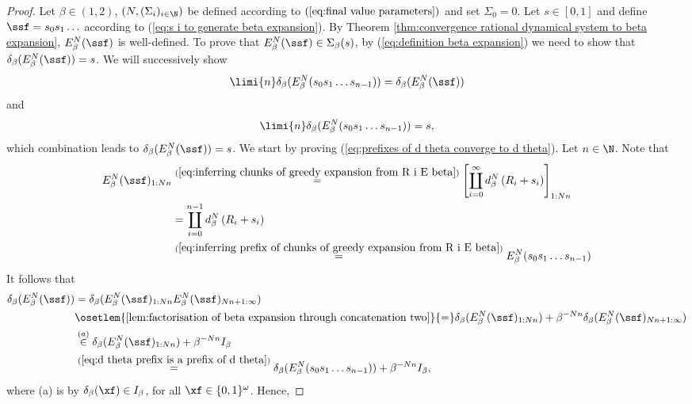 \begin{proof}
	Let $\beta \in (1,2)$, $(N,(\Sigma_i)_{i \in \N})$ be defined according to $(\ref{eq:final value parameters})$ and set $\Sigma_0 = 0$. Let $s \in [0,1]$ and define $\ssf = s_0s_1\ldots$ according to (\ref{eq:s i to generate beta expansion}). By Theorem \ref{thm:convergence rational dynamical system to beta expansion}, $E_\beta^N(\ssf)$ is well-defined. To prove that $E_\beta^N(\ssf) \in \Sigma_\beta(s)$, by (\ref{eq:definition beta expansion}) we need to show that $\delta_\beta(E_\beta^N(\ssf)) = s$. We will successively show 
	\begin{equation}\label{eq:prefixes of d theta converge to d theta}
		\limi{n} \delta_\beta(E_\beta^N(s_0s_1\ldots s_{n-1})) = \delta_\beta(E_\beta^N(\ssf))
	\end{equation}
	and
	\begin{equation}\label{eq:prefixes of d theta converge to s}
		\limi{n} \delta_\beta(E_\beta^N(s_0s_1\ldots s_{n-1})) = s,
	\end{equation}
	which combination leads to $\delta_\beta(E_\beta^N(\ssf)) = s$. We start by proving (\ref{eq:prefixes of d theta converge to d theta}). Let $n \in \N$. Note that
	\begin{align}
		E_\beta^N(\ssf)_{1:Nn} &\overset{(\ref{eq:inferring chunks of greedy expansion from R i E beta})}{=} \left[\coprod_{i=0}^\infty d_\beta^N\left(R_i + s_i\right)\right]_{1:Nn}\\
		&= \coprod_{i=0}^{n-1} d_\beta^N\left(R_i + s_i\right)\\
		&\overset{(\ref{eq:inferring prefix of chunks of greedy expansion from R i E beta})}{=} E_\beta^N(s_0s_1 \ldots s_{n-1}) \label{eq:d theta prefix is a prefix of d theta}
	\end{align}
	It follows that
	\begin{align}
		\delta_\beta(E_\beta^N(\ssf)) &= \delta_\beta(E_\beta^N(\ssf)_{1:Nn} E_\beta^N(\ssf)_{Nn+1:\infty})\\
		&\osetlem{\ref{lem:factorisation of beta expansion through concatenation two}}{=} \delta_\beta(E_\beta^N(\ssf)_{1:Nn}) + \beta^{-Nn} \delta_\beta(E_\beta^N(\ssf)_{Nn+1:\infty})\\
		&\overset{(a)}{\in} \delta_\beta(E_\beta^N(\ssf)_{1:Nn}) + \beta^{-Nn} I_\beta\\
		&\overset{(\ref{eq:d theta prefix is a prefix of d theta})}{=} \delta_\beta(E_\beta^N(s_0s_1 \ldots s_{n-1}))  + \beta^{-Nn}I_\beta,
	\end{align}
	where (a) is by $\delta_\beta(\xf) \in I_\beta$, for all $\xf \in \{0,1\}^\omega$. Hence, 

\end{proof}
